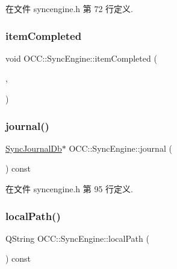 在文件 syncengine.\+h 第 72 行定义.

\mbox{\label{class_o_c_c_1_1_sync_engine_a0b820a5f033080d7d979a91f0c1fbc6b}} 
\subsubsection{\texorpdfstring{item\+Completed}{itemCompleted}}
{\footnotesize\ttfamily void O\+C\+C\+::\+Sync\+Engine\+::item\+Completed (\begin{DoxyParamCaption}\item[{const \hyperlink{class_o_c_c_1_1_sync_file_item}{Sync\+File\+Item} \&}]{,  }\item[{const \hyperlink{class_o_c_c_1_1_propagator_job}{Propagator\+Job} \&}]{ }\end{DoxyParamCaption})\hspace{0.3cm}{\ttfamily [signal]}}

\mbox{\label{class_o_c_c_1_1_sync_engine_af598f7fc3361738ca90890d277708b3c}} 
\subsubsection{\texorpdfstring{journal()}{journal()}}
{\footnotesize\ttfamily \hyperlink{class_o_c_c_1_1_sync_journal_db}{Sync\+Journal\+Db}$\ast$ O\+C\+C\+::\+Sync\+Engine\+::journal (\begin{DoxyParamCaption}{ }\end{DoxyParamCaption}) const}



在文件 syncengine.\+h 第 95 行定义.

\mbox{\label{class_o_c_c_1_1_sync_engine_acc63fae6a51d4321a46365477d8f657f}} 
\subsubsection{\texorpdfstring{local\+Path()}{localPath()}}
{\footnotesize\ttfamily Q\+String O\+C\+C\+::\+Sync\+Engine\+::local\+Path (\begin{DoxyParamCaption}{ }\end{DoxyParamCaption}) const}



